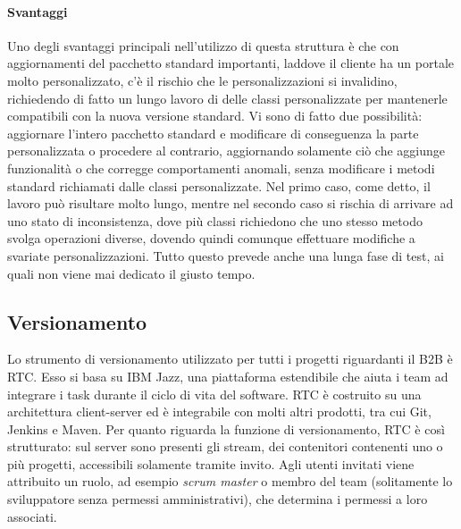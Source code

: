\paragraph{Svantaggi}
Uno degli svantaggi principali nell'utilizzo di questa struttura è che con aggiornamenti del pacchetto standard importanti, laddove il cliente ha un portale molto personalizzato, c'è il rischio che le personalizzazioni si invalidino, richiedendo di fatto un lungo lavoro di  delle classi personalizzate per mantenerle compatibili con la nuova versione standard. Vi sono di fatto due possibilità: aggiornare l'intero pacchetto standard e modificare di conseguenza la parte personalizzata o procedere al contrario, aggiornando solamente ciò che aggiunge funzionalità o che corregge comportamenti anomali, senza modificare i metodi standard richiamati dalle classi personalizzate. Nel primo caso, come detto, il lavoro può risultare molto lungo, mentre nel secondo caso si rischia di arrivare ad uno stato di inconsistenza, dove più classi richiedono che uno stesso metodo svolga operazioni diverse, dovendo quindi comunque effettuare modifiche a svariate personalizzazioni. Tutto questo prevede anche una lunga fase di test, ai quali non viene mai dedicato il giusto tempo.

\subsection{Versionamento}
Lo strumento di versionamento utilizzato per tutti i progetti riguardanti il B2B è \Gls{RTC}. Esso si basa su IBM Jazz, una piattaforma estendibile che aiuta i team ad integrare i task durante il ciclo di vita del software. RTC è costruito su una architettura client-server ed è integrabile con molti altri prodotti, tra cui \gls{Git}, \Gls{Jenkins} e \Gls{Maven}. Per quanto riguarda la funzione di versionamento, RTC è così strutturato: sul server sono presenti gli stream, dei contenitori contenenti uno o più progetti, accessibili solamente tramite invito. Agli utenti invitati viene attribuito un ruolo, ad esempio \textit{scrum master} o membro del team (solitamente lo sviluppatore senza permessi amministrativi), che determina i permessi a loro associati. 

